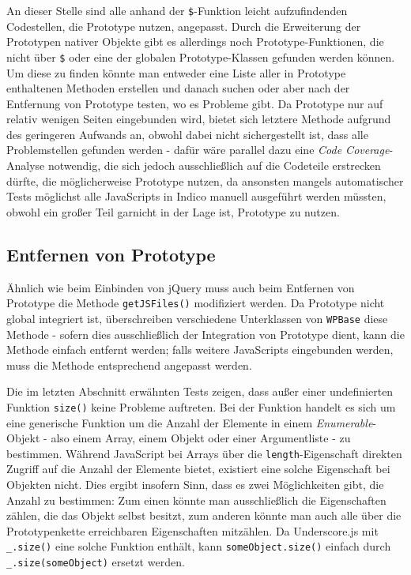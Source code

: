 An dieser Stelle sind alle anhand der \lstinline{$}-Funktion leicht aufzufindenden Codestellen, die
Prototype nutzen, angepasst. Durch die Erweiterung der Prototypen nativer Objekte gibt es allerdings
noch Prototype-Funktionen, die nicht über \lstinline{$} oder eine der globalen Prototype-Klassen
gefunden werden können. Um diese zu finden könnte man entweder eine Liste aller in Prototype
enthaltenen Methoden erstellen und danach suchen oder aber nach der Entfernung von Prototype testen,
wo es Probleme gibt. Da Prototype nur auf relativ wenigen Seiten eingebunden wird, bietet sich
letztere Methode aufgrund des geringeren Aufwands an, obwohl dabei nicht sichergestellt ist, dass
alle Problemstellen gefunden werden - dafür wäre parallel dazu eine \emph{Code Coverage}-Analyse
notwendig, die sich jedoch ausschließlich auf die Codeteile erstrecken dürfte, die möglicherweise
Prototype nutzen, da ansonsten mangels automatischer Tests möglichst alle JavaScripts in Indico
manuell ausgeführt werden müssten, obwohl ein großer Teil garnicht in der Lage ist, Prototype zu
nutzen.

\subsection{Entfernen von Prototype}

Ähnlich wie beim Einbinden von jQuery muss auch beim Entfernen von Prototype die Methode
\lstinline{getJSFiles()} modifiziert werden. Da Prototype nicht global integriert ist, überschreiben
verschiedene Unterklassen von \lstinline{WPBase} diese Methode - sofern dies ausschließlich der
Integration von Prototype dient, kann die Methode einfach entfernt werden; falls weitere JavaScripts
eingebunden werden, muss die Methode entsprechend angepasst werden.

Die im letzten Abschnitt erwähnten Tests zeigen, dass außer einer undefinierten Funktion
\lstinline{size()} keine Probleme auftreten. Bei der Funktion handelt es sich um eine generische
Funktion um die Anzahl der Elemente in einem \emph{Enumerable}-Objekt - also einem Array, einem
Objekt oder einer Argumentliste - zu bestimmen. Während JavaScript bei Arrays über die
\lstinline{length}-Eigenschaft direkten Zugriff auf die Anzahl der Elemente bietet, existiert eine
solche Eigenschaft bei Objekten nicht. Dies ergibt insofern Sinn, dass es zwei Möglichkeiten gibt,
die Anzahl zu bestimmen: Zum einen könnte man ausschließlich die Eigenschaften zählen, die das
Objekt selbst besitzt, zum anderen könnte man auch alle über die Prototypenkette erreichbaren
Eigenschaften mitzählen. Da Underscore.js mit \lstinline{_.size()} eine solche Funktion enthält,
kann \lstinline{someObject.size()} einfach durch \lstinline{_.size(someObject)} ersetzt werden.

